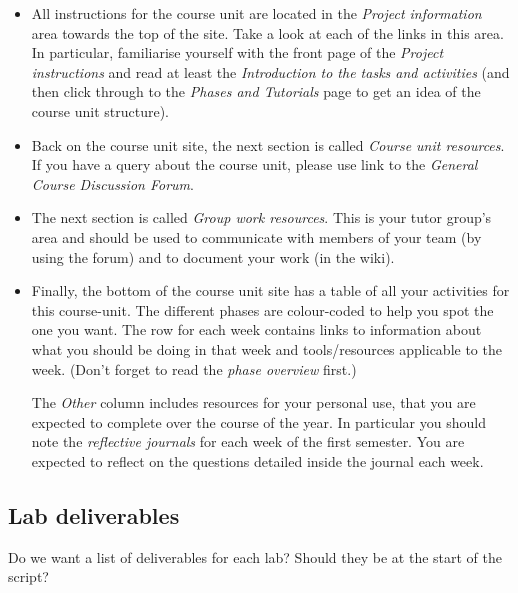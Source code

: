 \begin{itemize}
\item 
All instructions for the course unit are located in the \emph{Project information} area towards the top of the site. Take a look at each of the links in this area. In particular, familiarise yourself with the front page of the \emph{Project instructions} and read at least the \emph{Introduction to the tasks and activities} (and then click through to the \emph{Phases and Tutorials} page to get an idea of the course unit structure).

\item Back on the course unit site, the next section is called \emph{Course unit resources}. If you have a query about the course unit, please use link to the \emph{General Course Discussion Forum}.

\item The next section is called \emph{Group work resources}. This is your tutor group's area and should be used to communicate with members of your team (by using the forum) and to document your work (in the wiki).

\item Finally, the bottom of the course unit site has a table of all your activities for this course-unit. The different phases are colour-coded to help you spot the one you want. The row for each week contains links to information about what you should be doing in that week and tools/resources applicable to the week. (Don't forget to read the \emph{phase overview} first.)

  The \emph{Other}  column includes resources for your personal use, that you are expected to complete over the course of the year. In particular you should note the \emph{reflective journals} for each week of the first semester. You are expected to reflect on the questions detailed inside the journal each week.
\end{itemize}


\subsection{Lab deliverables}
\label{sec:lab-deliverables}

\begin{note}
  Do we want a list of deliverables for each lab? Should they be at the start of the script?
\end{note}

